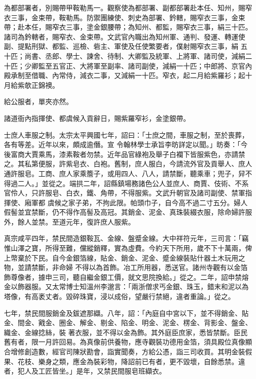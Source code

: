 \begin{pinyinscope}
 為都部署者，別賜帶甲鞍勒馬一。觀察使為都部署、副都部署赴本任、知州，賜窄衣三事，金束帶，鞍勒馬。防禦團練使、刺史為部署、鈐轄，賜窄衣三事，金束帶；赴本任，賜窄衣三事，塗金銀腰帶；為知州、都監，賜窄衣三事，絹三十匹。諸司為鈐轄者，賜窄衣、金束帶。文武官內職出為知州軍、通判、發運、轉運使副、提點刑獄、都監、巡檢、砦主、軍使及任使繁要者，僕射賜窄衣三事，絹
 五十匹；尚書、丞郎、學士、諫舍、待制、大卿監及統軍、上將軍、諸司使，減絹二十匹；少卿監至五官正、大將軍至副率、諸司副使，減絹一十匹；中郎將、京官內殿承制至借職、內常侍，減衣二事，又減絹一十匹。窄衣，起二月給紫羅衫；起十月給紫欹正錦襖。



 給公服者，單夾亦然。



 諸道衙內指揮使、都虞候入貢辭日，賜紫羅窄衫，金塗銀帶。



 士庶人車服之制。太宗太平興國七年，詔曰：「士庶之間，車服之制，至於喪葬，各有等差。近年以來，頗成逾僭。宣
 令翰林學士承旨李昉詳定以聞。」昉奏：「今後富商大賈乘馬，漆素鞍者勿禁。近年品官綠袍及舉子白襴下皆服紫色，亦請禁之。其私第便服，許紫皂衣、白袍。舊制，庶人服白，今請流外官及貢舉人、庶人通許服皂。工商、庶人家乘簷子，或用四人、八人，請禁斷，聽乘車；兜子，舁不得過二人。」並從之。端拱二年，詔縣鎮場務諸色公人並庶人、商賈、伎術、不系官伶人，只許服皂、白衣，鐵、角帶，不得服紫。文武升朝官及諸司副使、禁軍指揮使、廂軍都
 虞候之家子弟，不拘此限。帕頭巾子，自今高不過二寸五分。婦人假髻並宜禁斷，仍不得作高髻及高冠。其銷金、泥金、真珠裝綴衣服，除命婦許服外，餘人並禁。至道元年，復許庶人服紫。



 真宗咸平四年，禁民間造銀鞍瓦、金線、盤蹙金線。大中祥符元年，三司言：「竊惟山澤之寶，所得至難，儻縱銷釋，實為虛費。今約天下所用，歲不下十萬兩，俾上幣棄於下民。自今金銀箔線，貼金、銷金、泥金、蹙金線裝貼什器土木玩用之物，並請禁斷，非命婦
 不得以為首飾。冶工所用器，悉送官。諸州寺觀有以金箔飾尊像者，據申三司，聽自繼金銀工價，就文思院換給。」從之。二年，詔申禁熔金以飾器服。又太常博士知溫州李邈言：「兩浙僧求丐金銀、珠玉，錯末和泥以為塔像，有高袤丈者。毀碎珠寶，浸以成俗，望嚴行禁絕，違者重論。」從之。



 七年，禁民間服銷金及鈸遮那纈。八年，詔：「內庭自中宮以下，並不得銷金、貼金、間金、戭金、圈金、解金、剔金、陷金、明金、泥金、楞金、背影金、盤金、織金、金線捻絲，裝
 著衣服，並不得以金為飾。其外庭臣庶家，悉皆禁斷。臣民舊有者，限一月許回易。為真像前供養物，應寺觀裝功德用金箔，須具殿位真像顯合增修創造數，經官司陳狀勘會，詣實聞奏，方給公憑，詣三司收買。其明金裝假果、花枝、樂身之類，應金為裝彩物，降詔前已有者，更不毀壞，自餘悉禁。違者，犯人及工匠皆坐。」是年，又禁民間服皂班纈衣。




\end{pinyinscope}
